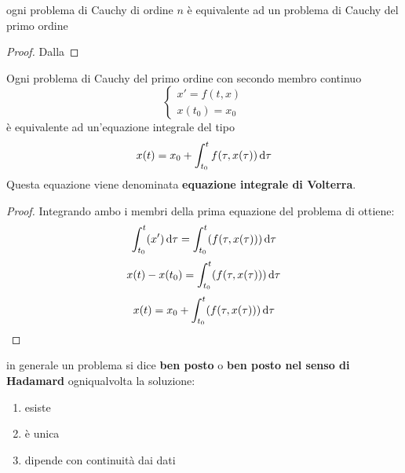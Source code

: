 \begin{proposition}
	ogni problema di Cauchy di ordine $n$ è equivalente ad un problema di Cauchy del primo ordine
	\begin{proof}
		Dalla 
	\end{proof}
\end{proposition}
\begin{definition}
	\label{def:equaz_volterra}
	Ogni problema di Cauchy del primo ordine con secondo membro continuo
	$$\begin{cases}x'=f(t,x)\\x(t_0)=x_0\end{cases}$$
	è equivalente ad un'equazione integrale del tipo
	$$x(t)=x_0+\int_{t_0}^{t}f(\tau,x(\tau))\,\mathrm{d}{\tau}$$
	Questa equazione viene denominata \textbf{equazione integrale di Volterra}.
	\begin{proof}
		Integrando ambo i membri della prima equazione del problema di ottiene:
		$$\int_{t_0}^{t}( x')\,\mathrm{d}{\tau}=\int_{t_0}^{t}(f(\tau,x(\tau)))\,\mathrm{d}{\tau}$$
		$$x(t)-x(t_0)=\int_{t_0}^{t}(f(\tau,x(\tau)))\,\mathrm{d}{\tau}$$
		$$x(t)=x_0+\int_{t_0}^{t}(f(\tau,x(\tau)))\,\mathrm{d}{\tau}$$
	\end{proof}
\end{definition}

\begin{observation}
	in generale un problema si dice \textbf{ben posto} o \textbf{ben posto nel senso di Hadamard} ogniqualvolta la soluzione:
	\begin{enumerate}
		\item esiste
		\item è unica
		\item dipende con continuità dai dati
	\end{enumerate}
\end{observation}

